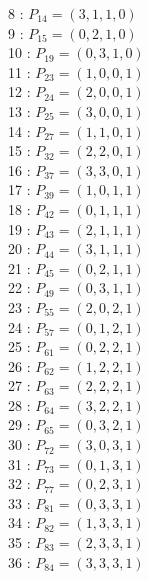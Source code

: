 \documentclass{article}
\begin{document}
{\begin{multicols}{3}
8 : $P_{14}=( 3, 1, 1, 0 )$\\
9 : $P_{15}=( 0, 2, 1, 0 )$\\
10 : $P_{19}=( 0, 3, 1, 0 )$\\
11 : $P_{23}=( 1, 0, 0, 1 )$\\
12 : $P_{24}=( 2, 0, 0, 1 )$\\
13 : $P_{25}=( 3, 0, 0, 1 )$\\
14 : $P_{27}=( 1, 1, 0, 1 )$\\
15 : $P_{32}=( 2, 2, 0, 1 )$\\
16 : $P_{37}=( 3, 3, 0, 1 )$\\
17 : $P_{39}=( 1, 0, 1, 1 )$\\
18 : $P_{42}=( 0, 1, 1, 1 )$\\
19 : $P_{43}=( 2, 1, 1, 1 )$\\
20 : $P_{44}=( 3, 1, 1, 1 )$\\
21 : $P_{45}=( 0, 2, 1, 1 )$\\
22 : $P_{49}=( 0, 3, 1, 1 )$\\
23 : $P_{55}=( 2, 0, 2, 1 )$\\
24 : $P_{57}=( 0, 1, 2, 1 )$\\
25 : $P_{61}=( 0, 2, 2, 1 )$\\
26 : $P_{62}=( 1, 2, 2, 1 )$\\
27 : $P_{63}=( 2, 2, 2, 1 )$\\
28 : $P_{64}=( 3, 2, 2, 1 )$\\
29 : $P_{65}=( 0, 3, 2, 1 )$\\
30 : $P_{72}=( 3, 0, 3, 1 )$\\
31 : $P_{73}=( 0, 1, 3, 1 )$\\
32 : $P_{77}=( 0, 2, 3, 1 )$\\
33 : $P_{81}=( 0, 3, 3, 1 )$\\
34 : $P_{82}=( 1, 3, 3, 1 )$\\
35 : $P_{83}=( 2, 3, 3, 1 )$\\
36 : $P_{84}=( 3, 3, 3, 1 )$\\
\end{multicols}


%


%


}%
\end{document}
